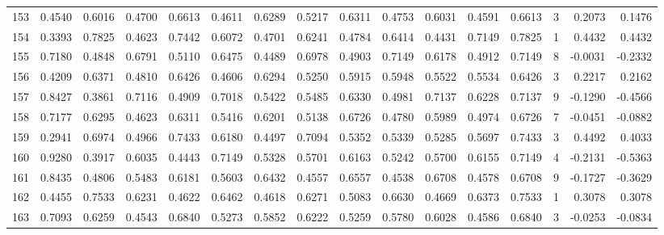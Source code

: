\begin{tabular}{lrrrrrrrrrrrrrrr}
153 &      0.4540 &  0.6016 &  0.4700 &  0.6613 &  0.4611 &  0.6289 &  0.5217 &  0.6311 &  0.4753 &  0.6031 &   0.4591 &     0.6613 &      3 &                    0.2073 &                     0.1476 \\
154 &      0.3393 &  0.7825 &  0.4623 &  0.7442 &  0.6072 &  0.4701 &  0.6241 &  0.4784 &  0.6414 &  0.4431 &   0.7149 &     0.7825 &      1 &                    0.4432 &                     0.4432 \\
155 &      0.7180 &  0.4848 &  0.6791 &  0.5110 &  0.6475 &  0.4489 &  0.6978 &  0.4903 &  0.7149 &  0.6178 &   0.4912 &     0.7149 &      8 &                   -0.0031 &                    -0.2332 \\
156 &      0.4209 &  0.6371 &  0.4810 &  0.6426 &  0.4606 &  0.6294 &  0.5250 &  0.5915 &  0.5948 &  0.5522 &   0.5534 &     0.6426 &      3 &                    0.2217 &                     0.2162 \\
157 &      0.8427 &  0.3861 &  0.7116 &  0.4909 &  0.7018 &  0.5422 &  0.5485 &  0.6330 &  0.4981 &  0.7137 &   0.6228 &     0.7137 &      9 &                   -0.1290 &                    -0.4566 \\
158 &      0.7177 &  0.6295 &  0.4623 &  0.6311 &  0.5416 &  0.6201 &  0.5138 &  0.6726 &  0.4780 &  0.5989 &   0.4974 &     0.6726 &      7 &                   -0.0451 &                    -0.0882 \\
159 &      0.2941 &  0.6974 &  0.4966 &  0.7433 &  0.6180 &  0.4497 &  0.7094 &  0.5352 &  0.5339 &  0.5285 &   0.5697 &     0.7433 &      3 &                    0.4492 &                     0.4033 \\
160 &      0.9280 &  0.3917 &  0.6035 &  0.4443 &  0.7149 &  0.5328 &  0.5701 &  0.6163 &  0.5242 &  0.5700 &   0.6155 &     0.7149 &      4 &                   -0.2131 &                    -0.5363 \\
161 &      0.8435 &  0.4806 &  0.5483 &  0.6181 &  0.5603 &  0.6432 &  0.4557 &  0.6557 &  0.4538 &  0.6708 &   0.4578 &     0.6708 &      9 &                   -0.1727 &                    -0.3629 \\
162 &      0.4455 &  0.7533 &  0.6231 &  0.4622 &  0.6462 &  0.4618 &  0.6271 &  0.5083 &  0.6630 &  0.4669 &   0.6373 &     0.7533 &      1 &                    0.3078 &                     0.3078 \\
163 &      0.7093 &  0.6259 &  0.4543 &  0.6840 &  0.5273 &  0.5852 &  0.6222 &  0.5259 &  0.5780 &  0.6028 &   0.4586 &     0.6840 &      3 &                   -0.0253 &                    -0.0834 \\

\end{tabular}
